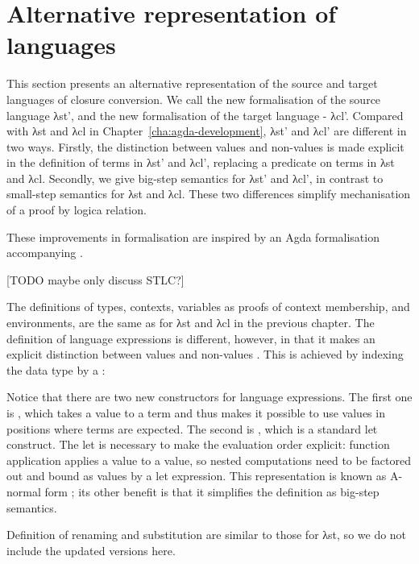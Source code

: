 \documentclass[bsc,frontabs,oneside,singlespacing,parskip,deptreport]{infthesis}
\theoremstyle{definition}
\theoremstyle{lemma}
\begin{document}
\section{Alternative representation of languages}
\label{sec:altern-form-interm}

This section presents an alternative representation of the source and
target languages of closure conversion. We call the new formalisation
of the source language λst', and the new formalisation of the target
language - λcl'. Compared with λst and λcl in
Chapter~\ref{cha:agda-development}, λst' and λcl' are different in two
ways. Firstly, the distinction between values and non-values is made
explicit in the definition of terms in λst' and λcl', replacing a
predicate on terms in λst and λcl. Secondly, we give big-step
semantics for λst' and λcl', in contrast to small-step semantics for
λst and λcl. These two differences simplify mechanisation of a proof
by logica relation.

These improvements in formalisation are inspired by an Agda
formalisation accompanying \cite{DBLP:conf/cpp/McLaughlinMS18}.

[TODO maybe only discuss STLC?]

The definitions of types, contexts, variables as proofs of context
membership, and environments, are the same as for λst and λcl in the
previous chapter. The definition of language expressions is different,
however, in that it makes an explicit distinction between values  and
non-values . This is achieved by indexing the  data
type by a :



Notice that there are two new constructors for language
expressions. The first one is , which takes a value 
to a term  and thus makes it possible to use values in
positions where terms are expected. The second is , which is
a standard let construct. The let is necessary to make the evaluation
order explicit: function application applies a value to a value, so
nested computations need to be factored out and bound as values by a
let expression. This representation is known as A-normal form
\cite{DBLP:conf/lfp/SabryF92}; its other benefit is that it simplifies
the definition as big-step semantics.

Definition of renaming and substitution are similar to those for
λst, so we do not include the updated versions here.
\end{document}
